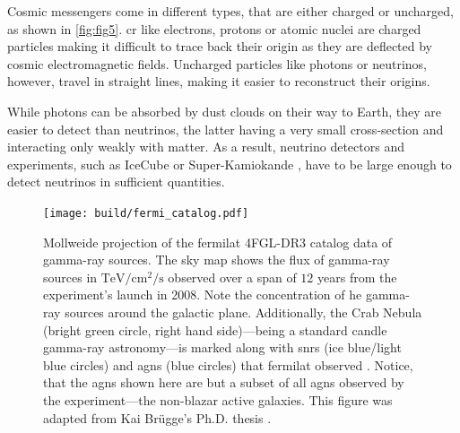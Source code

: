 Cosmic messengers come in different types, that are either charged or uncharged, as shown in \autoref{fig:fig5}.
\gls{cr} like electrons, protons or atomic nuclei are charged particles making it difficult to trace back their origin
as they are deflected by cosmic electromagnetic fields. Uncharged particles like photons or
neutrinos, however, travel in straight lines, making it easier to reconstruct their origins.

While photons can be absorbed by dust clouds on their way to Earth, they are easier to detect than
neutrinos, the latter having a very small cross-section and interacting only weakly with matter.
As a result, neutrino detectors and experiments, such as IceCube \cite{icecube_2006} or
Super-Kamiokande \cite{kamiokande}, have to be large enough to detect neutrinos in sufficient quantities.

\begin{figure}
    \centering
    \texttt{[image: build/fermi\_catalog.pdf]}
    \caption{Mollweide projection of the \gls{fermilat} 4FGL-DR3 catalog data of gamma-ray sources. The sky map
    shows the flux of gamma-ray sources in \(\si{\tera\eV\per\centi\meter\squared\per\second}\)
    observed over a span of \(\num{12}\) years from the experiment's launch in 2008. Note the
    concentration of \gls{he} gamma-ray sources around the galactic plane. Additionally,
    the Crab Nebula (bright green circle, right hand side)---being a standard candle gamma-ray astronomy---is marked
    along with \glspl{snr} (ice blue/light blue circles) and \glspl{agn} (blue circles) that \gls{fermilat}
    observed \cite{fermi4fgl, fermi4fgldr3}. Notice, that the \glspl{agn} shown here are but a subset
    of all \glspl{agn} observed by the experiment---the non-blazar active galaxies. This
    figure was adapted from Kai Br\"ugge's Ph.D. thesis \cite{bruegge_thesis}.}
    \label{fig:LAT}
\end{figure}

